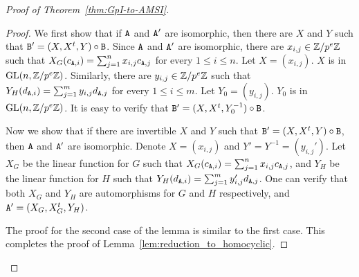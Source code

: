 \begin{proof}[Proof of Theorem~\ref{thm:GpI-to-AMSI}]
\begin{proof}
We first show that if $\mathtt{A}$ and $\mathtt{A}'$ are isomorphic, then there are $X$ and $Y$ such that $\mathtt{B}' = (X, X^t, Y)\circ \mathtt{B}$. 
Since $\mathtt{A}$ and $\mathtt{A}'$ are isomorphic, %
 there are $x_{i, j} \in \mathbb{Z} / p^e \mathbb{Z}$ such that $X_G(c_{\mathtt{A}, i}) = \sum_{j = 1}^n {x_{i, j}} c_{\mathtt{A}, j}$ %
 for every $1 \leq i \leq n$. %
 Let $X = (x_{i, j})$. %
 $X$ is in $\mathrm{GL}(n, \mathbb{Z} / p^e \mathbb{Z})$. %
Similarly, there are $y_{i, j} \in \mathbb{Z} / p^e \mathbb{Z}$ such that $Y_H(d_{\mathtt{A}, i}) = \sum_{j = 1}^m y_{i, j} d_{\mathtt{A}, j}$ for every $1 \leq i \leq m$. %
 Let $Y_0 = (y_{i, j})$. %
 $Y_0$ is in $\mathrm{GL}(n, \mathbb{Z} / p^e \mathbb{Z})$. %
It is easy to verify that $\mathtt{B}' = (X, X^t, Y_0^{-1}) \circ \mathtt{B}$. 

Now we show that if there are invertible $X$ and $Y$ such that $\mathtt{B}' = (X, X^t, Y)\circ \mathtt{B}$, then $\mathtt{A}$ and $\mathtt{A}'$ are isomorphic. 
Denote $X = (x_{i, j})$ and $Y' = Y^{-1} = (y_{i, j}')$. 
Let $X_G$ be the linear function for $G$ such that $X_G(c_{\mathtt{A}, i}) = \sum_{j = 1}^{n} x_{i, j} c_{\mathtt{A}, j}$, and 
$Y_H$ be the linear function for $H$ such that $Y_H(d_{\mathtt{A}, i}) = \sum_{j = 1}^{m} y'_{i, j} d_{\mathtt{A}, j}$. 
One can verify that both $X_G$ and $Y_H$ are automorphisms for $G$ and $H$ respectively, and $\mathtt{A}' = (X_G, X_G^t, Y_H)$. 

The proof for the second case of the lemma is similar to the first case. 
This completes the proof of Lemma~\ref{lem:reduction_to_homocyclic}.
\end{proof}


\end{proof}
